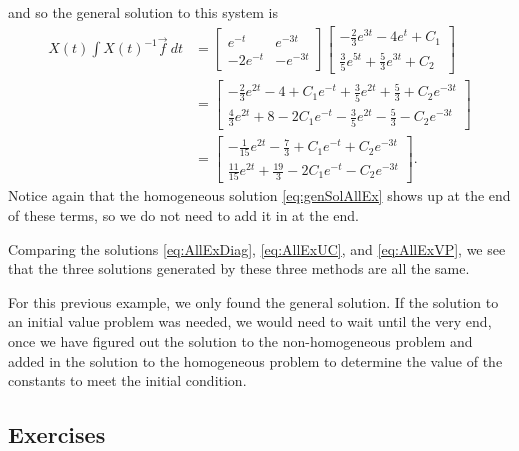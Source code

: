 \begin{exampleSol}
\begin{enumerate}[1.]
\begin{equation*}
\end{equation*}
and so the general solution to this system is
\begin{equation}\label{eq:AllExVP}
\begin{split}
X(t) \int X(t)^{-1}\vec{f}\ dt &= \begin{bmatrix} e^{-t} & e^{-3t} \\ -2e^{-t} & -e^{-3t} \end{bmatrix}\begin{bmatrix} -\frac{2}{3}e^{3t} - 4e^t + C_1 \\ \frac{3}{5}e^{5t} + \frac{5}{3}e^{3t} + C_2 \end{bmatrix} \\
&= \begin{bmatrix} 
-\frac{2}{3}e^{2t} - 4 + C_1e^{-t} + \frac{3}{5}e^{2t} + \frac{5}{3} + C_2e^{-3t} \\
 \frac{4}{3}e^{2t} + 8 - 2C_1e^{-t} - \frac{3}{5}e^{2t} - \frac{5}{3} - C_2e^{-3t}
\end{bmatrix} \\
&= \begin{bmatrix}
-\frac{1}{15} e^{2t} - \frac{7}{3} + C_1e^{-t} + C_2e^{-3t} \\
\frac{11}{15}e^{2t} + \frac{19}{3} - 2C_1e^{-t} - C_2e^{-3t}
\end{bmatrix}.
\end{split}
\end{equation}
Notice again that the homogeneous solution \eqref{eq:genSolAllEx} shows up at the end of these terms, so we do not need to add it in at the end.
\end{enumerate}
Comparing the solutions \eqref{eq:AllExDiag}, \eqref{eq:AllExUC}, and \eqref{eq:AllExVP}, we see that the three solutions generated by these three methods are all the same. 
\end{exampleSol}

For this previous example, we only found the general solution. If the solution to an initial value problem was needed, we would need to wait until the very end, once we have figured out the solution to the non-homogeneous problem and added in the solution to the homogeneous problem to determine the value of the constants to meet the initial condition.  

\subsection{Exercises}

